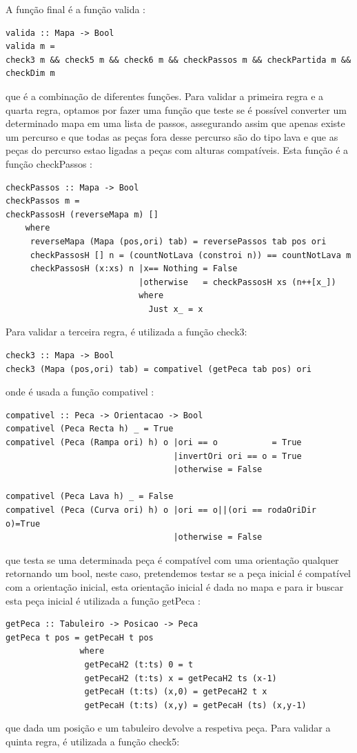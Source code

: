 \documentclass[a4paper]{report} %
\begin{document}
A função final é a função valida :
\begin{verbatim}
valida :: Mapa -> Bool
valida m = 
check3 m && check5 m && check6 m && checkPassos m && checkPartida m && checkDim m
\end{verbatim}
que é a combinação de diferentes funções.
Para validar a primeira regra e a quarta regra, optamos por fazer uma função que teste se é possível converter um determinado mapa em uma lista de passos, assegurando assim que apenas existe um percurso e que todas as peças fora desse percurso são do tipo lava e que as peças do percurso estao ligadas a peças com alturas compatíveis.
Esta função é a função checkPassos :

\begin{verbatim}
checkPassos :: Mapa -> Bool
checkPassos m = 
checkPassosH (reverseMapa m) []
    where
     reverseMapa (Mapa (pos,ori) tab) = reversePassos tab pos ori
     checkPassosH [] n = (countNotLava (constroi n)) == countNotLava m
     checkPassosH (x:xs) n |x== Nothing = False
                           |otherwise   = checkPassosH xs (n++[x_])
                           where
                             Just x_ = x
\end{verbatim}
Para validar a terceira regra, é utilizada a função check3:

\begin{verbatim}
check3 :: Mapa -> Bool
check3 (Mapa (pos,ori) tab) = compativel (getPeca tab pos) ori
\end{verbatim}
onde é usada a função compativel :

\begin{verbatim}
compativel :: Peca -> Orientacao -> Bool
compativel (Peca Recta h) _ = True
compativel (Peca (Rampa ori) h) o |ori == o           = True
                                  |invertOri ori == o = True
                                  |otherwise = False

compativel (Peca Lava h) _ = False
compativel (Peca (Curva ori) h) o |ori == o||(ori == rodaOriDir o)=True
                                  |otherwise = False
\end{verbatim}
que testa se uma determinada peça é compatível com uma orientação qualquer retornando um bool, neste caso, pretendemos testar se a peça inicial é compatível com a orientação inicial, esta orientação inicial é dada no mapa e para ir buscar esta peça inicial é utilizada a função getPeca :

\begin{verbatim}
getPeca :: Tabuleiro -> Posicao -> Peca
getPeca t pos = getPecaH t pos
               where
                getPecaH2 (t:ts) 0 = t
                getPecaH2 (t:ts) x = getPecaH2 ts (x-1)
                getPecaH (t:ts) (x,0) = getPecaH2 t x
                getPecaH (t:ts) (x,y) = getPecaH (ts) (x,y-1)
\end{verbatim} 
que dada um posição e um tabuleiro devolve a respetiva peça.
Para validar a quinta regra, é utilizada a função check5:
\end{document}
